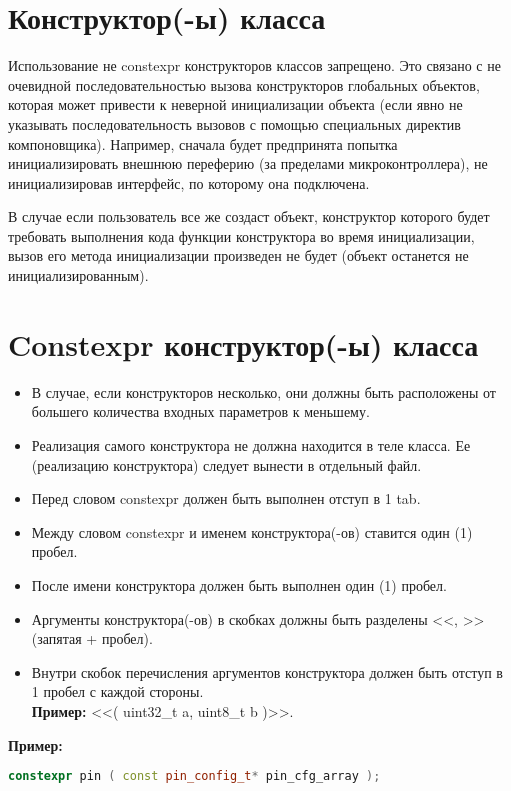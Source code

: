 \section{Конструктор(-ы) класса}\label{K:0:0}
Использование не constexpr конструкторов классов запрещено. Это связано с не очевидной последовательностью вызова конструкторов глобальных объектов, которая может привести к неверной инициализации объекта (если явно не указывать последовательность вызовов с помощью специальных директив компоновщика). Например, сначала будет предпринята попытка инициализировать внешнюю переферию (за пределами микроконтроллера), не инициализировав интерфейс, по которому она подключена.

В случае если пользователь все же создаст объект, конструктор которого будет требовать выполнения кода функции конструктора во время инициализации, вызов его метода инициализации произведен не будет (объект останется не инициализированным).

\section{Constexpr конструктор(-ы) класса}\label{K:0:1}
\begin{itemize}
	\item В случае, если конструкторов несколько, они должны быть расположены от большего количества входных параметров к меньшему.
	\item Реализация самого конструктора не должна находится в теле класса. Ее (реализацию конструктора) следует вынести в отдельный файл.
	\item Перед словом constexpr должен быть выполнен отступ в 1 tab.	
	\item Между словом constexpr и именем конструктора(-ов) ставится один (1) пробел.
	\item После имени конструктора должен быть выполнен один (1) пробел. 
	\item Аргументы конструктора(-ов) в скобках должны быть разделены <<, >> (запятая + пробел).
	\item Внутри скобок перечисления аргументов конструктора должен быть отступ в 1 пробел с каждой стороны.\\\textbf{Пример: } <<( uint32\_t a, uint8\_t b )>>.
\end{itemize}
\textbf{Пример:}\begin{lstlisting}[language=C++, frame=tlBR, basicstyle=\fontsize{10}{10}\ttfamily]
	constexpr pin ( const pin_config_t* pin_cfg_array );
\end{lstlisting}

